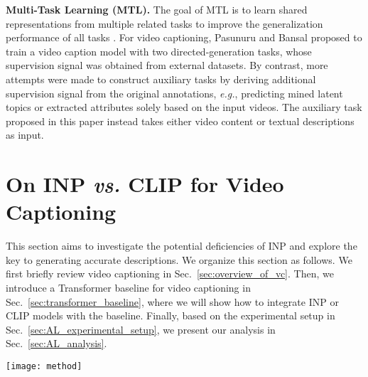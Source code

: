 \documentclass[runningheads]{llncs}
\newcommand\vs{\textit{vs.}}
\newcommand\eg{\textit{e.g.}}
\begin{document}
\noindent\textbf{Multi-Task Learning (MTL).} The goal of MTL is to learn shared representations from multiple related tasks to improve the generalization performance of all tasks \cite{caruana1997multitask}. For video captioning, Pasunuru and Bansal \cite{pasunuru2017multi} proposed to train a video caption model with two directed-generation tasks, whose supervision signal was obtained from external datasets. By contrast, more attempts were made to construct auxiliary tasks by deriving additional supervision signal from the original annotations, \eg, predicting mined latent topics \cite{chen2017video} or extracted attributes \cite{yu2017end,li2019end,huang2020image} solely based on the input videos. The auxiliary task proposed in this paper instead takes either video content or textual descriptions as input. 


\section{On INP \vs{} CLIP for Video Captioning}
\label{sec:AL}
This section aims to investigate the potential deficiencies of INP and explore the key to generating accurate descriptions. 
We organize this section as follows. We first briefly review video captioning in Sec.~\ref{sec:overview_of_vc}. Then, we introduce a Transformer baseline for video captioning in Sec.~\ref{sec:transformer_baseline}, where we will show how to integrate INP or CLIP models with the baseline. Finally, based on the experimental setup in Sec.~\ref{sec:AL_experimental_setup}, we present our analysis in Sec.~\ref{sec:AL_analysis}.


\begin{figure*}[t]
\centering
\texttt{[image: method]}
\caption{Pipeline of video captioning at the training stage. In Sec.~\ref{sec:AL}, we will review (a) and focus on the encoder part of video caption models in which conventional methods usually use ImageNet pre-training models to encode the video content. In Sec.~\ref{sec:AR}, we will elaborate our proposed Dual Concept Detection (DCD) shown in (b), where ``SS'' denotes the sparse sampling.
}
\label{fig:pipeline}
\end{figure*}
\end{document}
